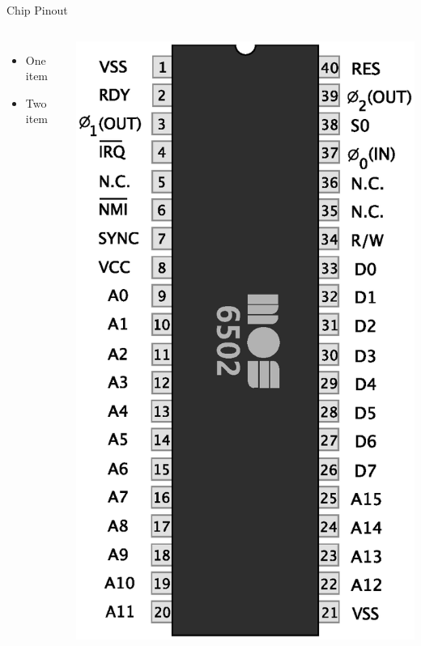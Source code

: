 \documentclass{beamer}
\begin{document}
\begin{frame}{Chip Pinout}
  \begin{columns}
    \begin{itemize}
    \item
      One item
    \item
      Two item
    \end{itemize}

    \includegraphics[scale=0.25]{../assets/MOS6502.eps}
    
  \end{columns}
\end{frame}
\end{document}
